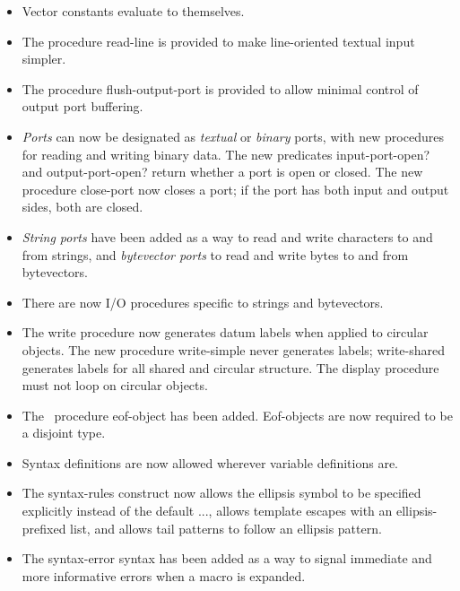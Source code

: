 \begin{itemize}
\item Vector constants evaluate to themselves.

\item The procedure {\cf read-line} is provided to make line-oriented textual input
simpler.

\item The procedure {\cf flush-output-port} is provided to allow minimal
control of output port buffering.

\item {\em Ports} can now be designated as {\em textual} or {\em
binary} ports, with new procedures for reading and writing binary
data.
The new predicates {\cf input-port-open?} and {\cf output-port-open?} return whether a port is open or closed.
The new procedure {\cf close-port} now closes a port; if the port
has both input and output sides, both are closed.

\item {\em String ports} have been added as a way to read and write
characters to and from strings, and {\em bytevector ports} to read
and write bytes to and from bytevectors.

\item There are now I/O procedures specific to strings and bytevectors.

\item The {\cf write} procedure now generates datum labels when applied to
circular objects.  The new procedure {\cf write-simple} never generates
labels; {\cf write-shared} generates labels for all shared and circular
structure.
The {\cf display} procedure must not loop on circular objects.

\item The \rsixrs\ procedure {\cf eof-object} has been added.
Eof-objects are now required to be a disjoint type.

\item Syntax definitions are now allowed wherever variable definitions are.

\item The {\cf syntax-rules} construct now allows
the ellipsis symbol to be specified explicitly instead of the default
{\cf ...}, allows template escapes with an ellipsis-prefixed list, and
allows tail patterns to follow an ellipsis pattern.

\item The {\cf syntax-error} syntax has been added as a way to signal immediate
and more informative errors when a macro is expanded.


\end{itemize}
